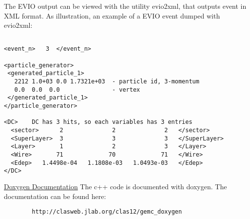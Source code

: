 The EVIO output can be viewed with the utility evio2xml, that outputs event in XML format.
As illustration, an example of a EVIO event dumped with evio2xml:
\footnotesize
\begin{verbatim}

<event_n>   3  </event_n>

<particle_generator>
 <generated_particle_1>
   2212 1.0+03 0.0 1.7321e+03  - particle id, 3-momentum
   0.0  0.0  0.0               - vertex
 </generated_particle_1>
</particle_generator>

<DC>    DC has 3 hits, so each variables has 3 entries
  <sector>      2              2              2   </sector>
  <SuperLayer>  3              3              3   </SuperLayer>
  <Layer>       1              2              3   </Layer>
  <Wire>       71             70             71   </Wire>
  <Edep>   1.4498e-04   1.1808e-03   1.0493e-03   </Edep>
</DC>
\end{verbatim}
\normalsize

\vskip 0.5cm
\underline{Doxygen Documentation}
\vskip 0.5cm
The c++ code is documented with doxygen. The documentation can be found here:
\begin{verbatim}
        http://clasweb.jlab.org/clas12/gemc_doxygen
\end{verbatim}

